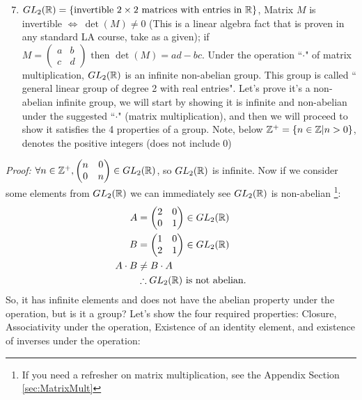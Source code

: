 \begin{enumerate}
\setcounter{enumi}{6}
    \item $GL_2({\mathbb{ R}})=\{\text{invertible } 2\times 2 \text{ matrices with entries in } {\mathbb{ R}}\}$, Matrix $M$ is invertible $\iff  \ \det(M)\neq 0$ (This is a linear algebra fact that is proven in any standard LA course, take as a given); if $M= 	\left(\begin{matrix}
a & b \\
c & d 
\end{matrix}\right) \text{ then } \det(M)=ad-bc$. Under the operation ``$\cdot$" of matrix multiplication, $GL_2({\mathbb{ R}})$ is an infinite non-abelian group. This group is called `` general linear group of degree 2 with real entries". Let's prove it's a non-abelian infinite group, we will start by showing it is infinite and non-abelian under the suggested ``$\cdot$" (matrix multiplication), and then we will proceed to show it satisfies the 4 properties of a group. Note, below ${\mathbb{ Z}}^+ = \{n\in {\mathbb{ Z}}| n>0\}$, denotes the positive integers (does not include 0)\steezybreak\\
\end{enumerate}
\noindent \textit{Proof:} $\forall n \in {\mathbb{ Z}}^+, \left(\begin{matrix}
n & 0 \\
0 & n 
\end{matrix}\right) \in GL_2({\mathbb{ R}})$, so $GL_2({\mathbb{ R}})$ is infinite. Now if we consider some elements from $GL_2({\mathbb{ R}})$ we can immediately see $GL_2({\mathbb{ R}})$ is non-abelian \footnote{If you need a refresher on matrix multiplication, see the Appendix Section \ref{sec:MatrixMult}}:
\begin{align}
    A &= \left(\begin{matrix}
2 & 0 \\
0 & 1 
\end{matrix}\right) \in GL_2({\mathbb{ R}}) \nonumber \\
B &= \left(\begin{matrix}
1 & 0 \\
2 & 1 
\end{matrix}\right) \in GL_2({\mathbb{ R}}) \nonumber \\
A\cdot B &\neq B\cdot A \nonumber \\
&\therefore GL_2({\mathbb{ R}}) \text{ is not abelian.} \nonumber
\end{align}
So, it has infinite elements and does not have the abelian property under the operation, but is it a group? Let's show the four required properties: Closure, Associativity under the operation, Existence of an identity element, and existence of inverses under the operation:
